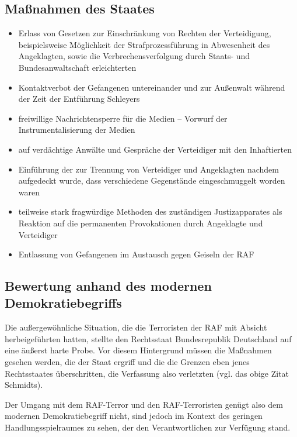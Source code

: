 \subsection*{Maßnahmen des Staates}

\renewcommand*{\dictumwidth}{0.8\textwidth}

\begin{itemize}
\item Erlass von Gesetzen zur Einschränkung von Rechten der
Verteidigung, beispielsweise Möglichkeit der Strafprozessführung in
Abwesenheit des Angeklagten, sowie die Verbrechensverfolgung durch
Staats- und Bundesanwaltschaft erleichterten

\item Kontaktverbot der Gefangenen untereinander und zur Außenwalt
während der Zeit der Entführung Schleyers

\item freiwillige Nachrichtensperre für die Medien
-- Vorwurf der Instrumentalisierung der Medien

\item {} auf verdächtige Anwälte und Gespräche der
Verteidiger mit den Inhaftierten

\item Einführung der  zur Trennung von Verteidiger
und Angeklagten nachdem aufgedeckt wurde, dass verschiedene
Gegenstände eingeschmuggelt worden waren

\item teilweise stark fragwürdige Methoden des zuständigen
Justizapparates als Reaktion auf die permanenten Provokationen durch
Angeklagte und Verteidiger

\item Entlassung von Gefangenen im Austausch gegen Geiseln der RAF
\end{itemize}


\subsection*{Bewertung anhand des modernen Demokratiebegriffs}

Die außergewöhnliche Situation, die die Terroristen der RAF mit
Absicht herbeigeführten hatten, stellte den Rechtsstaat Bundesrepublik
Deutschland auf eine äußerst harte Probe. Vor diesem Hintergrund
müssen die Maßnahmen gesehen werden, die der Staat ergriff und die
die Grenzen eben jenes Rechtsstaates überschritten, die Verfassung
also verletzten (vgl. das obige Zitat Schmidts).

Der Umgang mit dem RAF-Terror und den RAF-Terroristen genügt also
dem modernen Demokratiebegriff nicht, sind jedoch im Kontext des
geringen Handlungsspielraumes zu sehen, der den Verantwortlichen zur
Verfügung stand.

\endinput

- Entlarvung des Rechtsstaats
- Grenzen des Rechtsstaats kaum durchbrochen

